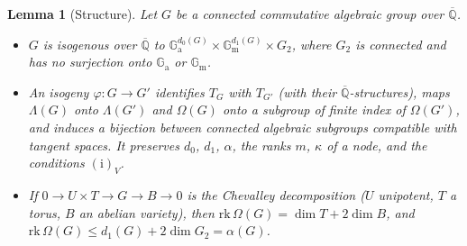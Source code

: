 \documentclass[11pt]{amsart}
\newtheorem{lemma}[theorem]{Lemma}
\theoremstyle{definition}
\newcommand{\Qb}{\overline{\mathbb{Q}}}
\newcommand{\Ga}{\mathbb{G}_{\mathrm a}}
\newcommand{\Gm}{\mathbb{G}_{\mathrm m}}
\begin{document}
\begin{lemma}[Structure]\label{lem:struct}
Let $G$ be a connected commutative algebraic group over $\Qb$.
\begin{itemize}
\item[(a)] $G$ is isogenous over $\Qb$ to $\Ga^{d_0(G)}\times\Gm^{d_1(G)}\times G_2$, where $G_2$ is connected and has no
surjection onto $\Ga$ or $\Gm$.
\item[(b)] An isogeny $\varphi\colon G\to G'$ identifies $T_G$ with $T_{G'}$ (with their $\Qb$-structures), maps $\Lambda(G)$
onto $\Lambda(G')$ and $\Omega(G)$ onto a subgroup of finite index of $\Omega(G')$, and induces a bijection between connected
algebraic subgroups compatible with tangent spaces. It preserves $d_0$, $d_1$, $\alpha$, the ranks $m$, $\kappa$ of a node,
and the conditions $(\mathrm i)_V$.
\item[(c)] If $0\to U\times T\to G\to B\to0$ is the Chevalley decomposition ($U$ unipotent, $T$ a torus, $B$ an abelian
variety), then $\mathrm{rk}\,\Omega(G)=\dim T+2\dim B$, and $\mathrm{rk}\,\Omega(G)\le d_1(G)+2\dim G_2=\alpha(G)$.
\end{itemize}
\end{lemma}
\end{document}
